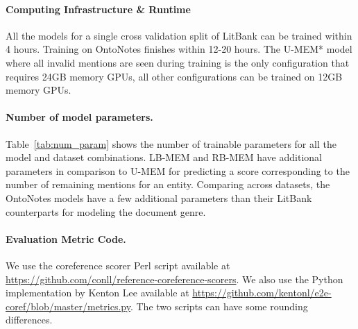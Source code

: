 \documentclass[11pt,a4paper]{article}
\newcommand{\unbounded}{U-MEM\xspace}
\newcommand{\learned}{LB-MEM\xspace}
\newcommand{\lru}{RB-MEM\xspace}
\begin{document}
\paragraph{Computing Infrastructure \& Runtime}
All the models for a single cross validation split of LitBank can be trained within 4 hours. Training on OntoNotes finishes within 12-20 hours.
The U-MEM* model where all invalid mentions are seen during training is the only configuration that requires 24GB memory GPUs, all other configurations can be trained on 12GB memory GPUs.


\paragraph{Number of model parameters.}

Table~\ref{tab:num_param} shows the number of trainable parameters for all the model and dataset combinations. \learned and \lru have additional parameters in comparison to \unbounded for predicting a score corresponding to the number of remaining mentions for an entity.
Comparing across datasets, the OntoNotes models  have a few additional parameters than their LitBank counterparts for modeling the document genre.


\paragraph{Evaluation Metric Code.}
We use the coreference scorer Perl script available at \url{https://github.com/conll/reference-coreference-scorers}.
We also use the Python implementation by Kenton Lee available at \url{https://github.com/kentonl/e2e-coref/blob/master/metrics.py}.
The two scripts can have some rounding differences.
\end{document}
